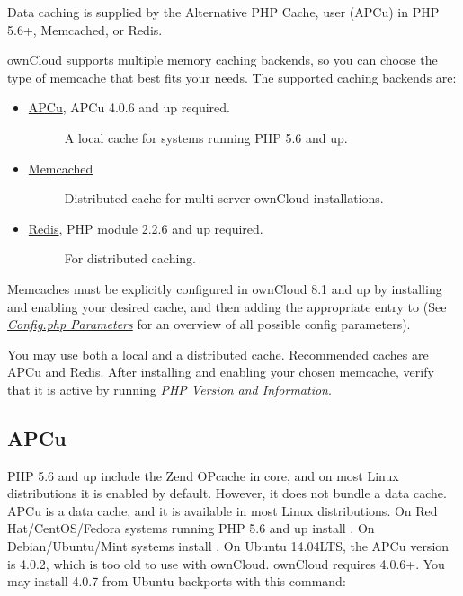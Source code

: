 \documentclass[letterpaper,10pt,english]{sphinxmanual}
\begin{document}
Data caching is supplied by the Alternative PHP Cache, user (APCu) in PHP
5.6+, Memcached, or Redis.

ownCloud supports multiple memory caching backends, so you can choose the type
of memcache that best fits your needs. The supported caching backends are:
\begin{itemize}
\item {} \begin{description}
\item[{\href{https://pecl.php.net/package/APCu}{APCu}, APCu 4.0.6 and up required.}] \leavevmode
A local cache for systems running PHP 5.6 and up.

\end{description}

\item {} \begin{description}
\item[{\href{http://www.memcached.org/}{Memcached}}] \leavevmode
Distributed cache for multi-server ownCloud installations.

\end{description}

\item {} \begin{description}
\item[{\href{http://redis.io/}{Redis}, PHP module 2.2.6 and up required.}] \leavevmode
For distributed caching.

\end{description}

\end{itemize}

Memcaches must be explicitly configured in ownCloud 8.1 and up by installing
and enabling your desired cache, and then adding the appropriate entry to
 (See {\hyperref[configuration_server/config_sample_php_parameters::doc]{\emph{Config.php Parameters}}} for an overview of
all possible config parameters).

You may use both a local and a distributed cache. Recommended caches are APCu
and Redis. After installing and enabling your chosen memcache, verify that it is
active by running {\hyperref[issues/general_troubleshooting:label-phpinfo]{\emph{PHP Version and Information}}}.


\subsection{APCu}
\label{configuration_server/caching_configuration:id1}
PHP 5.6 and up include the Zend OPcache in core, and on most Linux
distributions it is enabled by default. However, it does
not bundle a data cache. APCu is a data cache, and it is available in most
Linux distributions. On Red Hat/CentOS/Fedora systems running PHP 5.6 and up
install . On Debian/Ubuntu/Mint systems install .
On Ubuntu 14.04LTS, the APCu version is 4.0.2, which is too old to use with ownCloud. ownCloud requires 4.0.6+. You may install 4.0.7 from Ubuntu backports with this command:
\end{document}
